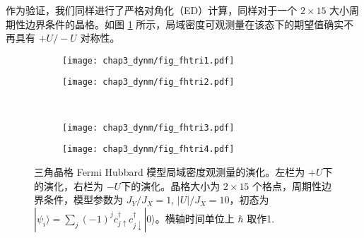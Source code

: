 作为验证，我们同样进行了严格对角化（ED）计算，同样对于一个 $2\times15$ 大小周期性边界条件的晶格。如图 \ref{fig:dynm:fhted} 所示，局域密度可观测量在该态下的期望值确实不再具有 $+U/-U$ 对称性。

\begin{figure}[!htb]
\begin{subfigure}{.5\textwidth}
\texttt{[image: chap3\_dynm/fig\_fhtri1.pdf]}
\end{subfigure}
\begin{subfigure}{.5\textwidth}
\texttt{[image: chap3\_dynm/fig\_fhtri2.pdf]}
\end{subfigure}\\
\begin{subfigure}{.5\textwidth}
\texttt{[image: chap3\_dynm/fig\_fhtri3.pdf]}
\end{subfigure}
\begin{subfigure}{.5\textwidth}
\texttt{[image: chap3\_dynm/fig\_fhtri4.pdf]}
\end{subfigure}
\caption{三角晶格 Fermi Hubbard 模型局域密度观测量的演化。左栏为 $+U$下的演化，右栏为 $-U$下的演化。晶格大小为 $2\times15$ 个格点，周期性边界条件，模型参数为 $J_Y/J_X=1$, $|U|/J_X=10$，初态为 $|\psi_i\rangle=\sum_j (-1)^jc_{j\uparrow}^{\dagger}c_{j\downarrow}^{\dagger}|0\rangle$。横轴时间单位上 $\hbar$ 取作1.}
\label{fig:dynm:fhted}
\end{figure}



